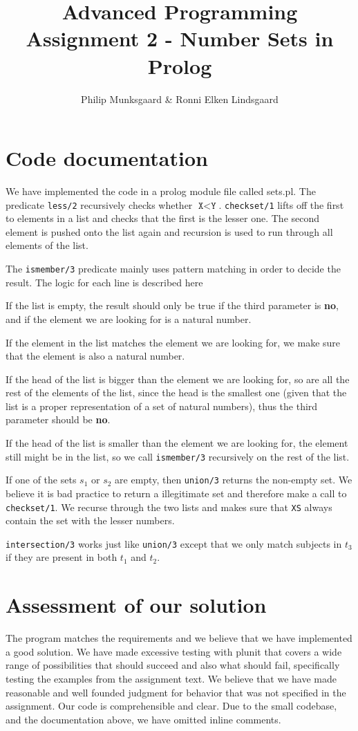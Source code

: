 \documentclass{article}
\title{Advanced Programming Assignment 2 - Number Sets in Prolog}
\author{Philip Munksgaard \& Ronni Elken Lindsgaard}
\newcommand{\prolog}[1]{\texttt{#1}}
\newcommand{\direction}[1]{\textbf{#1}}
\begin{document}
\maketitle
\section{Code documentation}
We have implemented the code in a prolog module file called sets.pl. The
predicate \prolog{less/2} recursively checks whether $\prolog{X} < \prolog{Y}$.
\prolog{checkset/1} lifts off the first to elements in a list and checks that
the first is the lesser one. The second element is pushed onto the list again
and recursion is used to run through all elements of the list.

The \prolog{ismember/3} predicate mainly uses pattern matching in order to
decide the result. The logic for each line is described here
\begin{description}
  \item If the list is empty, the result should only be true if the third
    parameter is \direction{no}, and if the element we are looking for is a natural number.
  \item If the element in the list matches the element we are looking for, we
    make sure that the element is also a natural number.
  \item If the head of the list is bigger than the element we are
    looking for, so are all the rest of the elements of the list,
    since the head is the smallest one (given that the list is a
    proper representation of a set of natural numbers), thus the third
    parameter should be \direction{no}.
  \item If the head of the list is smaller than the element we are
    looking for, the element still might be in the list, so we call
    \prolog{ismember/3} recursively on the rest of the list.
\end{description}

If one of the sets $s_1$ or $s_2$ are empty, then \prolog{union/3} returns the
non-empty set. We believe it is bad practice to return a illegitimate set and
therefore make a call to \prolog{checkset/1}.
We recurse through the two lists and makes sure that \prolog{XS} always contain
the set with the lesser numbers.

\prolog{intersection/3} works just like \prolog{union/3} except that we only
match subjects in $t_3$ if they are present in both $t_1$ and $t_2$.

\section{Assessment of our solution}
The program matches the requirements and we believe that we have implemented a
good solution. We have made excessive testing with plunit that covers a wide
range of possibilities that should succeed and also what should fail,
specifically testing the examples from the assignment text. We believe
that we have made reasonable and well founded judgment for behavior that was not
specified in the assignment.
Our code is comprehensible and clear. Due to the small codebase, and the
documentation above, we have omitted inline comments.
\end{document}
